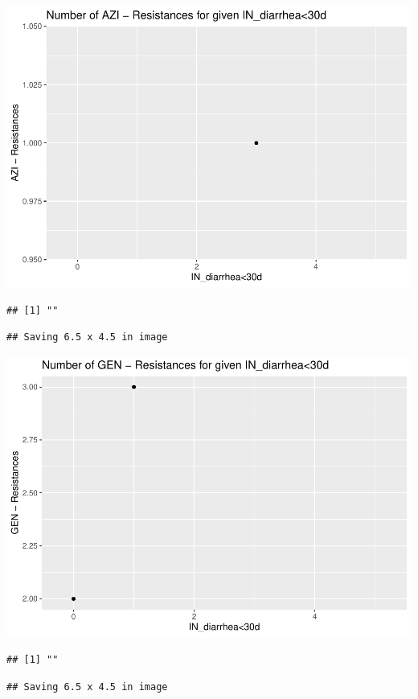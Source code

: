 \documentclass[
]{article}
\begin{document}
\includegraphics{NResistenzen_files/figure-latex/numerical_variables-33.pdf}

\begin{verbatim}
## [1] ""
\end{verbatim}

\begin{verbatim}
## Saving 6.5 x 4.5 in image
\end{verbatim}

\includegraphics{NResistenzen_files/figure-latex/numerical_variables-34.pdf}

\begin{verbatim}
## [1] ""
\end{verbatim}

\begin{verbatim}
## Saving 6.5 x 4.5 in image
\end{verbatim}
\end{document}
